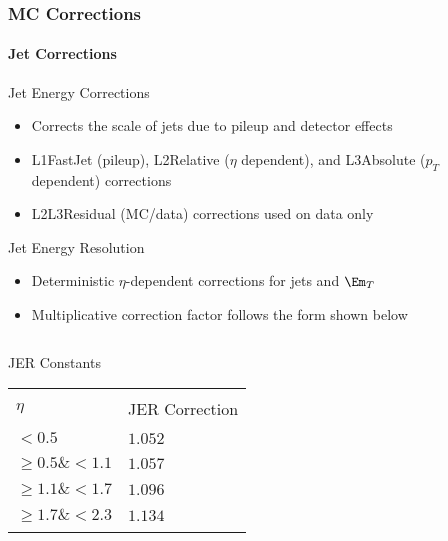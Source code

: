 \begin{frame}
	\frametitle{MC Corrections}
    \framesubtitle{Jet Corrections}
    \vspace*{-0.24cm}
    \begin{block}{Jet Energy Corrections}
    	\begin{itemize}
	    	\footnotesize
    		\item Corrects the scale of jets due to pileup and detector effects
    		\item L1FastJet (pileup), L2Relative ($\eta$ dependent), and L3Absolute ($p_{T}$ dependent) corrections
    		\item L2L3Residual (MC/data) corrections used on data only
    	\end{itemize}
    \end{block}
    \vspace*{1.4cm}
    \begin{block}{Jet Energy Resolution}
    	\begin{itemize}
    		\footnotesize
    		\item Deterministic $\eta$-dependent corrections for jets and $\Em_{T}$
    		\item Multiplicative correction factor follows the form shown below
    	\end{itemize}
    \end{block}
    \vspace*{-0.50cm}
    \begin{columns}[T]
    	\begin{column}{0.27\textwidth}
    		\begin{block}{JER Constants}
    			\tiny
    			\begin{table}[ht]
					\centering
					\begin{tabular}{| l | l |}
						\hline\hline\\[-2.75ex]
						$\eta$ &JER Correction\\
						\hline\\[-2.75ex]
						$<0.5$ & $1.052$\\
						\hline\\[-2.75ex]
						$\geqslant0.5\&<1.1$ & $1.057$\\
						\hline\\[-2.75ex]
						$\geqslant1.1\&<1.7$ & $1.096$\\
						\hline\\[-2.75ex]
						$\geqslant1.7\&<2.3$ & $1.134$\\
						\hline\\[-2.75ex]

\end{tabular}
\end{table}
\end{block}
\end{column}
\end{columns}
\end{frame}
